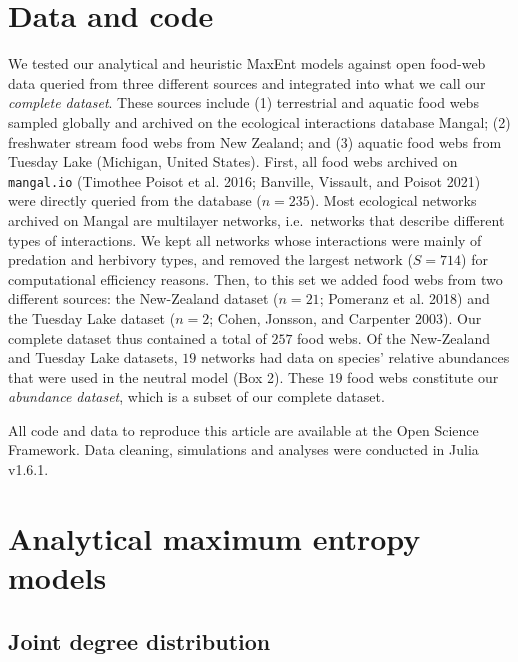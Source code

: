 \documentclass[10pt,oneside]{article}
\begin{document}
\hypertarget{data-and-code}{%
\section{Data and code}\label{data-and-code}}

We tested our analytical and heuristic MaxEnt models against open
food-web data queried from three different sources and integrated into
what we call our \emph{complete dataset}. These sources include (1)
terrestrial and aquatic food webs sampled globally and archived on the
ecological interactions database Mangal; (2) freshwater stream food webs
from New Zealand; and (3) aquatic food webs from Tuesday Lake (Michigan,
United States). First, all food webs archived on \texttt{mangal.io}
(Timothee Poisot et al. 2016; Banville, Vissault, and Poisot 2021) were
directly queried from the database (\(n = 235\)). Most ecological
networks archived on Mangal are multilayer networks, i.e.~networks that
describe different types of interactions. We kept all networks whose
interactions were mainly of predation and herbivory types, and removed
the largest network (\(S = 714\)) for computational efficiency reasons.
Then, to this set we added food webs from two different sources: the
New-Zealand dataset (\(n = 21\); Pomeranz et al. 2018) and the Tuesday
Lake dataset (\(n = 2\); Cohen, Jonsson, and Carpenter 2003). Our
complete dataset thus contained a total of \(257\) food webs. Of the
New-Zealand and Tuesday Lake datasets, \(19\) networks had data on
species' relative abundances that were used in the neutral model (Box
2). These \(19\) food webs constitute our \emph{abundance dataset},
which is a subset of our complete dataset.

All code and data to reproduce this article are available at the Open
Science Framework. Data cleaning, simulations and analyses were
conducted in Julia v1.6.1.

\hypertarget{analytical-maximum-entropy-models}{%
\section{Analytical maximum entropy
models}\label{analytical-maximum-entropy-models}}

\hypertarget{joint-degree-distribution}{%
\subsection{Joint degree distribution}\label{joint-degree-distribution}}
\end{document}
